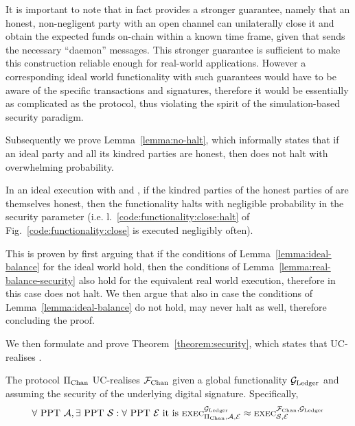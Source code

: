   It is important to note that in fact \pchan provides a stronger guarantee,
  namely that an honest, non-negligent party with an open channel can
  unilaterally close it and obtain the expected funds on-chain within a known
  time frame, given that \environment sends the necessary ``daemon'' messages.
  This stronger guarantee is sufficient to make this construction reliable
  enough for real-world applications. However a corresponding ideal world
  functionality with such guarantees would have to be aware of the specific
  transactions and signatures, therefore it would be essentially as complicated
  as the protocol, thus violating the spirit of the simulation-based security
  paradigm.

  Subsequently we prove Lemma~\ref{lemma:no-halt}, which informally states that
  if an ideal party and all its kindred parties are honest, then \fchan does not
  halt with overwhelming probability.

\begin{lemma}[No halt]
\label{lemma:no-halt}
  In an ideal execution with \fchan and \simulator, if the kindred parties of
  the honest parties of \fchan are themselves honest, then the functionality
  halts with negligible probability in the security parameter (i.e.
  l.~\ref{code:functionality:close:halt} of Fig.~\ref{code:functionality:close}
  is executed negligibly often).
\end{lemma}

  This is proven by first arguing that if
  the conditions of Lemma~\ref{lemma:ideal-balance} for the ideal world hold,
  then the conditions of Lemma~\ref{lemma:real-balance-security} also hold for
  the equivalent real world execution, therefore in this case \fchan does not
  halt. We then argue that also in case the conditions of
  Lemma~\ref{lemma:ideal-balance} do not hold, \fchan may never halt as well,
  therefore concluding the proof.

  We then formulate and prove Theorem~\ref{theorem:security}, which states that
  \pchan UC-realises \fchan.

\begin{theorem}
  \label{theorem:security}
  The protocol $\Pi_{\mathrm{Chan}}$ UC-realises $\mathcal{F}_{\mathrm{Chan}}$ given a global functionality
  $\mathcal{G}_{\mathrm{Ledger}}$ and assuming the security of the underlying digital signature.
  Specifically,
  \begin{gather*}
    \forall \text{ PPT } \mathcal{A}, \exists \text{ PPT } \mathcal{S}: \forall
    \text{ PPT } \mathcal{E} \text{ it is }
    \textsc{exec}^{\mathcal{G}_{\mathrm{Ledger}}}_{\Pi_{\mathrm{Chan}}, \mathcal{A}, \mathcal{E}} \approx
    \textsc{exec}^{\mathcal{F}_{\mathrm{Chan}}, \mathcal{G}_{\mathrm{Ledger}}}_{\mathcal{S}, \mathcal{E}}
  \end{gather*}
\end{theorem}

